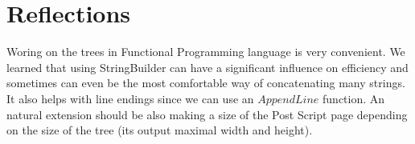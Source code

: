 \documentclass[12pt]{article}
\begin{document}
\section{Reflections}
Woring on the trees in Functional Programming language is very convenient. We learned that using
StringBuilder can have a significant influence on efficiency and sometimes can even be the most
comfortable way of concatenating many strings. It also helps with line endings since we can use an
 $AppendLine$ function. An natural extension should be also making a size of the Post Script page
 depending on the size of the tree (its output maximal width and height). 
\end{document}
